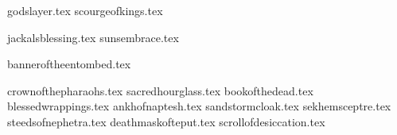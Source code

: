 
\raggedcolumns
\begin{multicols}{2}

\subtitle{\weaponenchantments}
\startsortedpricelist

{godslayer.tex}
{scourgeofkings.tex}

\endsortedpricelist

\subtitle{\armourenchantments}
\startsortedpricelist

{jackalsblessing.tex}
{sunsembrace.tex}

\endsortedpricelist

\subtitle{\bannerenchantments}

\startsortedpricelist

{banneroftheentombed.tex}

\endsortedpricelist

\subtitle{\artefacts}

\startsortedpricelistNSP

{crownofthepharaohs.tex}
{sacredhourglass.tex}
{bookofthedead.tex}
{blessedwrappings.tex}
{ankhofnaptesh.tex}
{sandstormcloak.tex}
{sekhemsceptre.tex}
{steedsofnephetra.tex}
{deathmaskofteput.tex}
{scrollofdesiccation.tex}

\endsortedpricelistNSP
\end{multicols}
